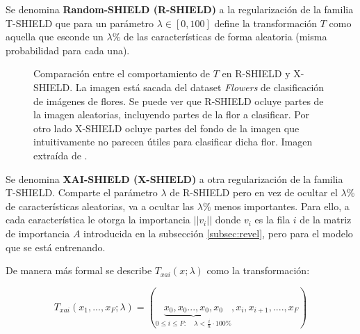 Se denomina \textbf{Random-SHIELD (R-SHIELD)} a la regularización de la familia T-SHIELD que para un parámetro $\lambda \in [0,100]$ define la transformación $T$ como aquella que esconde un $\lambda\%$ de las características de forma aleatoria (misma probabilidad para cada una).

\begin{figure}[h]
\noindent
{}
\caption{ Comparación entre el comportamiento de $T$ en R-SHIELD y X-SHIELD. La imagen está sacada del dataset \textit{Flowers} de clasificación de imágenes de flores. Se puede ver que R-SHIELD ocluye partes de la imagen aleatorias, incluyendo partes de la flor a clasificar. Por otro lado X-SHIELD ocluye partes del fondo de la imagen que intuitivamente no parecen útiles para clasificar dicha flor. Imagen extraída de \cite{REVEL}.}
\label{fig:rshield_vs_xshield}
\end{figure}


Se denomina \textbf{XAI-SHIELD (X-SHIELD)} a otra regularización de la familia T-SHIELD. Comparte el parámetro $\lambda$ de R-SHIELD pero en vez de ocultar el $\lambda\%$ de características aleatorias, va a ocultar las $\lambda\%$ menos importantes. Para ello, a cada característica le otorga la importancia $||v_i||$ donde $v_i$ es la fila $i$ de la matriz de importancia $A$ introducida en la subsección \ref{subsec:revel}, pero para el modelo que se está entrenando.

De manera más formal se describe $T_{xai}(x;\lambda)$ como la transformación:

\begin{equation}
T_{xai}(x_1,...,x_F; \lambda) = (\underbrace{x_0,x_0...,x_0,x_0}_{0 \leq i\leq F : \quad \lambda < \frac{i}{n}\cdot 100\%},x_i,x_{i+1},....,x_F)
\end{equation}




